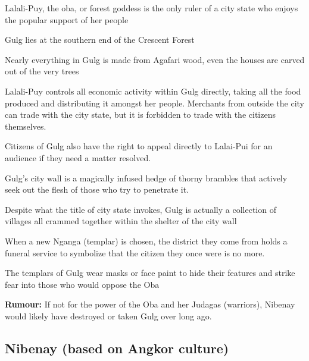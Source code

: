 \begin{multicols}{2}
\begin{description}
    \item Lalali-Puy, the oba, or forest goddess is the only ruler of a city state who enjoys the popular support of her people
    \item Gulg lies at the southern end of the Crescent Forest
    \item Nearly everything in Gulg is made from Agafari wood, even the houses are carved out of the very trees
    \item Lalali-Puy controls all economic activity within Gulg directly, taking all the food produced and distributing it amongst her people. Merchants from outside the city can trade with the city state, but it is forbidden to trade with the citizens themselves.
    \item Citizens of Gulg also have the right to appeal directly to Lalai-Pui for an audience if they need a matter resolved.
    \item Gulg’s city wall is a magically infused hedge of thorny brambles that actively seek out the flesh of those who try to penetrate it.
    \item Despite what the title of city state invokes, Gulg is actually a collection of villages all crammed together within the shelter of the city wall
    \item When a new Nganga (templar) is chosen, the district they come from holds a funeral service to symbolize that the citizen they once were is no more.
    \item The templars of Gulg wear masks or face paint to hide their features and strike fear into those who would oppose the Oba
    \item \textbf{Rumour:} If not for the power of the Oba and her Judagas (warriors), Nibenay would likely have destroyed or taken Gulg over long ago.
\end{description}

\subsection{Nibenay (based on Angkor culture)}


\end{multicols}

